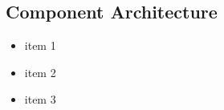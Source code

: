 \subsection{Component Architecture}
\begin{frame}
	\begin{itemize}
		\item item 1
		\item item 2
		\item item 3
	\end{itemize}
\end{frame}
